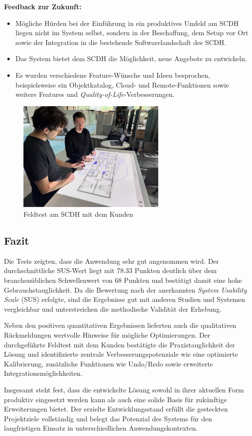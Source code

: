 \textbf{Feedback zur Zukunft:}
\begin{itemize}
    \item Mögliche Hürden bei der Einführung in ein produktives Umfeld am SCDH liegen nicht im System selbst, sondern in der Beschaffung, dem Setup vor Ort sowie der Integration in die bestehende Softwarelandschaft des SCDH.
    \item Das System bietet dem SCDH die Möglichkeit, neue Angebote zu entwickeln.
    \item Es wurden verschiedene Feature-Wünsche und Ideen besprochen, beispielsweise ein Objektkatalog, Cloud- und Remote-Funktionen sowie weitere Features und \emph{Quality-of-Life}-Verbesserungen.
\end{itemize}


\begin{figure}[H]
    \centering
    \includegraphics[width=0.65\textwidth]{graphics/feldtest.JPG}
    \caption{Feldtest am SCDH mit dem Kunden}
    \label{fig:feldtest}
\end{figure}

\subsection{Fazit}

Die Tests zeigten, dass die Anwendung sehr gut angenommen wird. Der durchschnittliche SUS-Wert liegt mit 78.33 Punkten deutlich über dem branchenüblichen Schwellenwert von 68 Punkten und bestätigt damit eine hohe Gebrauchstauglichkeit.  
Da die Bewertung nach der anerkannten \textit{System Usability Scale} (SUS) erfolgte, sind die Ergebnisse gut mit anderen Studien und Systemen vergleichbar und unterstreichen die methodische Validität der Erhebung.  

Neben den positiven quantitativen Ergebnissen lieferten auch die qualitativen Rückmeldungen wertvolle Hinweise für mögliche Optimierungen. Der durchgeführte Feldtest mit dem Kunden bestätigte die Praxistauglichkeit der Lösung und identifizierte zentrale Verbesserungspotenziale wie eine optimierte Kalibrierung, zusätzliche Funktionen wie Undo/Redo sowie erweiterte Integrationsmöglichkeiten.  

Insgesamt steht fest, dass die entwickelte Lösung sowohl in ihrer aktuellen Form produktiv eingesetzt werden kann als auch eine solide Basis für zukünftige Erweiterungen bietet. Der erzielte Entwicklungsstand erfüllt die gesteckten Projektziele vollständig und belegt das Potenzial des Systems für den langfristigen Einsatz in unterschiedlichen Anwendungskontexten.


